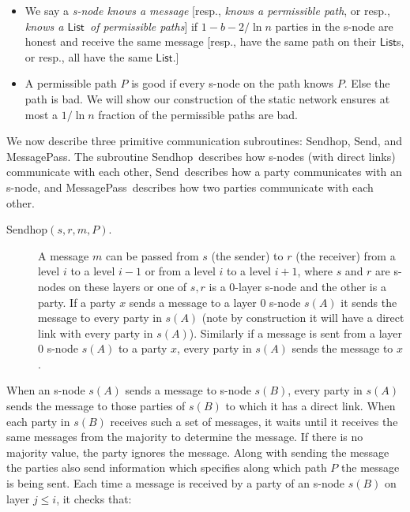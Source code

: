 \documentclass[11pt,letter]{article}
\theoremstyle{mytheoremstyle}
\newcommand{\Sendhop}{\textsf{Sendhop}}
\newcommand{\Send}{\textsf{Send}}
\newcommand{\MessagePass}{\textsf{MessagePass}}
\newcommand{\lst}{\ensuremath{\mathsf{List}}}
\begin{document}
\begin{itemize}
	\item We say a {\em \textsf{s-node} knows a message} [resp., {\em knows a permissible path}, or resp., {\em knows a \lst\ of permissible paths}] if $1-b-2/\ln n$ parties in the \textsf{s-node} are honest and receive the same message [resp., have the same path on their \lst s, or resp., all have the same \lst.]
	
	\item A permissible path $P$ is good if every \textsf{s-node} on the path knows $P$. Else the path is bad. We will show our construction of the static network ensures at most a $1/\ln n$ fraction of the permissible paths are bad.
\end{itemize}

We now describe three primitive communication subroutines: \Sendhop, \Send, and \MessagePass. The subroutine \Sendhop\ describes how \textsf{s-node}s (with direct links) communicate with each other, \Send\ describes how a party communicates with an \textsf{s-node}, and \MessagePass\ describes how two parties communicate with each other.

\begin{description}
	\item[\Sendhop$(s, r, m,P)$.]
	A message $m$ can be passed from $s$ (the sender) to $r$ (the receiver) from a level $i$ to a level $i-1$ or from a level $i$ to a level $i+1$, where $s$ and $r$ are \textsf{s-node}s on these layers or one of $s, r$ is a 0-layer \textsf{s-node} and the other is a party. If a party $x$ sends a message to a layer $0$ \textsf{s-node} $s(A)$ it sends the message to every party in $s(A)$ (note by construction it will have a direct link with every party in $s(A)$). Similarly if a message is sent from a layer $0$ \textsf{s-node} $s(A)$ to a party $x$, every party in $s(A)$ sends the message to $x$.
\end{description}

When an \textsf{s-node} $s(A)$ sends a message to \textsf{s-node} $s(B)$, every party in $s(A)$ sends the message to those parties of $s(B)$ to which it has a direct link. When each party in $s(B)$ receives such a set of messages, it waits until it receives the same messages from the majority to determine the message. If there is no majority value, the party ignores the message. Along with sending the message the parties also send information which specifies along which path $P$ the message is being sent. Each time a message is received by a party of an \textsf{s-node} $s(B)$ on layer $j
\leq i$, it checks that:
\end{document}
